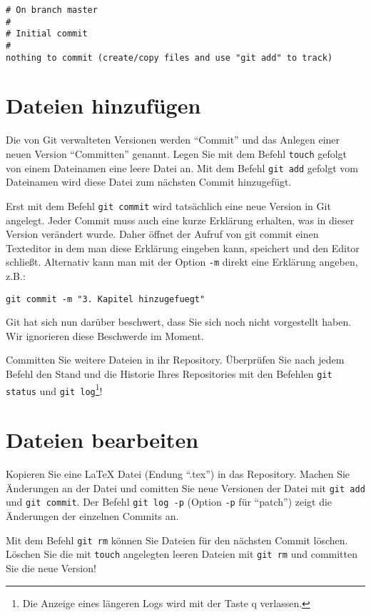 \documentclass[11pt,a4paper,twoside]{scrartcl}
\begin{document}
\begin{lstlisting}
# On branch master
#
# Initial commit
#
nothing to commit (create/copy files and use "git add" to track)
\end{lstlisting}

\section{Dateien hinzufügen}

Die von Git verwalteten Versionen werden ``Commit'' und das Anlegen einer
neuen Version ``Committen'' genannt. Legen Sie mit dem Befehl
\lstinline{touch} gefolgt von einem Dateinamen eine leere Datei an. Mit dem
Befehl \lstinline{git add} gefolgt vom Dateinamen wird diese Datei zum
nächsten Commit hinzugefügt.

Erst mit dem Befehl \lstinline{git commit} wird tatsächlich eine neue Version
in Git angelegt. Jeder Commit muss auch eine kurze Erklärung erhalten, was in
dieser Version verändert wurde. Daher öffnet der Aufruf von git commit einen
Texteditor in dem man diese Erklärung eingeben kann, speichert und den Editor
schließt. Alternativ kann man mit der Option \lstinline{-m} direkt eine
Erklärung angeben, z.B.:

\begin{lstlisting}
git commit -m "3. Kapitel hinzugefuegt"
\end{lstlisting}

Git hat sich nun darüber beschwert, dass Sie sich noch nicht vorgestellt
haben. Wir ignorieren diese Beschwerde im Moment.

Committen Sie weitere Dateien in ihr Repository. Überprüfen Sie nach jedem
Befehl den Stand und die Historie Ihres Repositories mit den Befehlen
\lstinline{git status} und \lstinline{git log}\footnote{Die Anzeige eines
  längeren Logs wird mit der Taste q verlassen.}!

\section{Dateien bearbeiten}

Kopieren Sie eine LaTeX Datei (Endung ``.tex'') in das Repository. Machen Sie
Änderungen an der Datei und comitten Sie neue Versionen der Datei mit
\lstinline{git add} und \lstinline{git commit}. Der Befehl
\lstinline{git log -p} (Option \lstinline{-p} für ``patch'')
zeigt die Änderungen der einzelnen
Commits an.

Mit dem Befehl \lstinline{git rm} können Sie Dateien für den nächsten Commit
löschen. Löschen Sie die mit \lstinline{touch} angelegten leeren Dateien mit
\lstinline{git rm} und committen Sie die neue Version!
\end{document}

